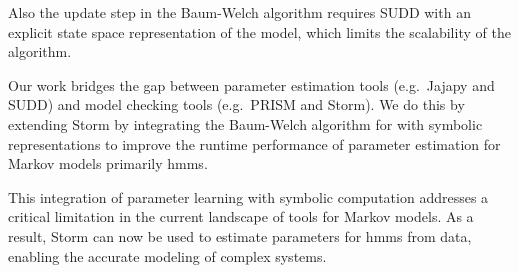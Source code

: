 Also the update step in the Baum-Welch algorithm requires SUDD with an explicit state space representation of the model, which limits the scalability of the algorithm.

Our work bridges the gap between parameter estimation tools (e.g.\ Jajapy and SUDD) and model checking tools (e.g.\ PRISM and Storm).
We do this by extending Storm by integrating the Baum-Welch algorithm for with symbolic representations to improve the runtime performance of parameter estimation for Markov models primarily \glspl{hmm}.

This integration of parameter learning with symbolic computation addresses a critical limitation in the current landscape of tools for Markov models.
As a result, Storm can now be used to estimate parameters for \glspl{hmm} from data, enabling the accurate modeling of complex systems.












